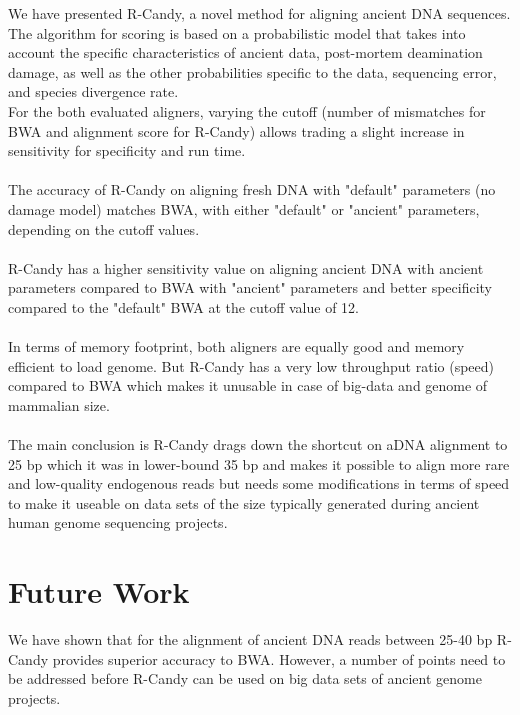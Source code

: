 \documentclass[11pt,a4paper]{report}
\begin{document}
We have presented R-Candy, a novel method for aligning ancient DNA sequences.
The algorithm for scoring is based on a probabilistic model that takes into account 
the specific characteristics of ancient data, post-mortem deamination damage, as 
well as the other probabilities specific to the data, sequencing error, and species
divergence rate. 
\\
For the both evaluated aligners, varying the cutoff (number of mismatches for BWA 
and alignment score for R-Candy) allows trading a slight increase in sensitivity 
for specificity and run time.
\\\\
The accuracy of R-Candy on aligning fresh DNA with "default" parameters (no damage model) 
matches BWA, with either "default" or "ancient" parameters, depending  on the cutoff values.
\\\\
R-Candy has a higher sensitivity value on aligning ancient DNA with ancient parameters
compared to BWA with "ancient" parameters and better specificity compared to the 
"default" BWA at the cutoff value of 12.
\\\\
In terms of memory footprint, both aligners are equally good and memory efficient
to load genome. But R-Candy has a very low throughput ratio (speed) compared to 
BWA which makes it unusable in case of big-data and genome of mammalian size. 
\\\\
The main conclusion is R-Candy drags down the shortcut on aDNA alignment to 25 bp 
which it was in lower-bound 35 bp and makes it possible to align more rare and 
low-quality endogenous reads but needs some modifications in terms of speed to 
make it useable on data sets of the size typically generated during ancient human
genome sequencing projects. 



 

\section{Future Work} \label{Future Work}
We have shown that for the alignment of ancient DNA reads between 25-40 
bp R-Candy provides superior accuracy to BWA.  
However, a number of points need to be addressed before R-Candy can be used 
on big data sets of ancient genome projects. 

\end{document}
